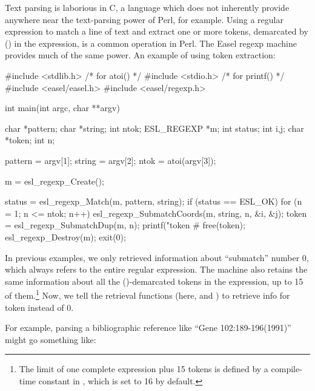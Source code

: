Text parsing is laborious in C, a language which does not inherently
provide anywhere near the text-parsing power of Perl, for example.
Using a regular expression to match a line of text and extract one or
more tokens, demarcated by () in the expression, is a common operation
in Perl. The Easel regexp machine provides much of the same power. An
example of using token extraction:

\begin{cchunk}
#include <stdlib.h> /* for atoi()   */
#include <stdio.h>  /* for printf() */
#include <easel/easel.h>
#include <easel/regexp.h>

int
main(int argc, char **argv)
{
  char        *pattern;
  char        *string;
  int          ntok;
  ESL_REGEXP  *m;		
  int          status;
  int          i,j;
  char        *token;
  int          n;

  pattern = argv[1];
  string  = argv[2];
  ntok    = atoi(argv[3]);

  m = esl_regexp_Create();

  status = esl_regexp_Match(m, pattern, string);
  if (status == ESL_OK) 
    { 
      for (n = 1; n <= ntok; n++) 
	{
	  esl_regexp_SubmatchCoords(m, string, n, &i, &j);
	  token = esl_regexp_SubmatchDup(m, n);
	  printf("token #%
	  free(token);
	}
    }
  esl_regexp_Destroy(m);
  exit(0);
}
\end{cchunk}

In previous examples, we only retrieved information about ``submatch''
number 0, which always refers to the entire regular expression. The
machine also retains the same information about all the ()-demarcated
tokens in the expression, up to 15 of them.\footnote{The limit of one
complete expression plus 15 tokens is defined by a compile-time
constant  in , which is set to
16 by default.} Now, we tell the retrieval functions (here,
 and
) to retrieve info for token
 instead of 0.

For example, parsing a bibliographic reference like ``Gene
102:189-196(1991)'' might go something like:


